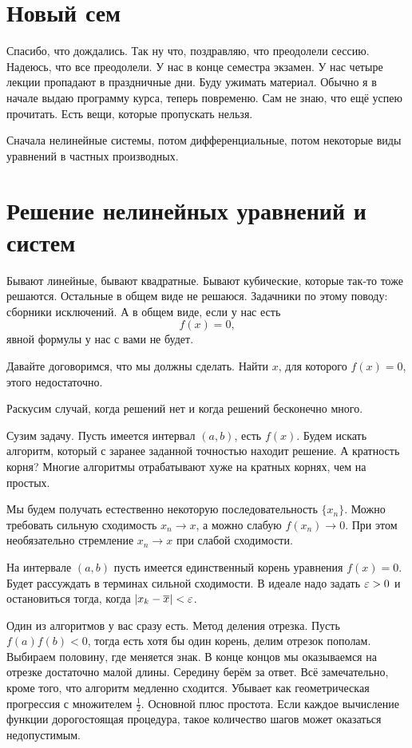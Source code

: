 \section{Новый сем}
Спасибо, что дождались. Так ну что, поздравляю, что преодолели сессию. Надеюсь, что все преодолели. У нас в конце семестра экзамен. У нас четыре лекции пропадают в праздничные дни. Буду ужимать материал. Обычно я в начале выдаю программу курса, теперь повременю. Сам не знаю, что ещё успею прочитать. Есть вещи, которые пропускать нельзя.

Сначала нелинейные системы, потом дифференциальные, потом некоторые виды уравнений в частных производных.
\section{Решение нелинейных уравнений и систем}
Бывают линейные, бывают квадратные. Бывают кубические, которые так-то тоже решаются. Остальные в общем виде не решаюся. Задачники по этому поводу: сборники исключений. А в общем виде, если у нас есть
\[
  f(x) = 0,
\]
явной формулы у нас с вами не будет.

Давайте договоримся, что мы должны сделать. Найти $x$, для которого $f(x) = 0$, этого недостаточно.

Раскусим случай, когда решений нет и когда решений бесконечно много.

Сузим задачу. Пусть имеется интервал $(a,b)$, есть $f(x)$. Будем искать алгоритм, который с заранее заданной точностью находит решение. А кратность корня? Многие алгоритмы отрабатывают хуже на кратных корнях, чем на простых.

Мы будем получать естественно некоторую последовательность $\{x_n\}$. Можно требовать сильную сходимость $x_n \to x$, а можно слабую $f(x_n) \to 0$. При этом необязательно стремление $x_n\to x$ при слабой сходимости.

На интервале $(a,b)$ пусть имеется единственный корень уравнения $f(x)=0$. Будет рассуждать в терминах сильной сходимости. В идеале надо задать $\varepsilon>0$ и остановиться тогда, когда 
$|x_k-\overline{x}|<\varepsilon$.

Один из алгоритмов у вас сразу есть. Метод деления отрезка. Пусть $f(a)f(b)<0$, тогда есть хотя бы один корень, делим отрезок пополам. Выбираем половину, где меняется знак. В конце концов мы оказываемся на отрезке достаточно малой длины. Середину берём за ответ. Всё замечательно, кроме того, что алгоритм медленно сходится. Убывает как геометрическая прогрессия с множителем $\frac12$.
Основной плюс простота.
Если каждое вычисление функции дорогостоящая процедура, такое количество шагов может оказаться недопустимым.

